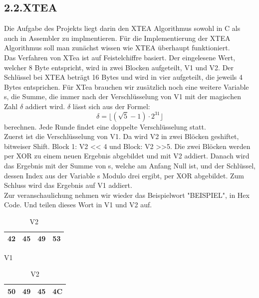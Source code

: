 \documentclass[course=asp]{aspdoc}
\begin{document}
\subsection*{2.2.XTEA}
Die Aufgabe des Projekts liegt darin den XTEA Algorithmus sowohl in C als auch in Assembler zu implmentieren. Für die Implementierung der XTEA Algorithmus soll man zunächst wissen wie XTEA überhaupt funktioniert. \\
Das Verfahren von XTea ist auf Feistelchiffre basiert. Der eingelesene Wert, welcher 8 Byte entspricht, wird in zwei Blocken aufgeteilt, V1 und V2. Der Schlüssel bei XTEA beträgt 16 Bytes und wird in vier aufgeteilt, die jeweils 4 Bytes entsprichen. Für XTea brauchen wir zusätzlich noch eine weitere Variable s, die Summe, die immer nach der Verschlüsselung von V1 mit der magischen Zahl ${\delta}$ addiert wird. ${\delta}$ lässt sich aus der Formel:
\begin{equation}
     \delta  =   \lfloor ( \surd 5 -1)  \cdot  2^{31} \rfloor
\end{equation}
berechnen. Jede Runde findet eine doppelte Verschlüsselung statt. \\
Zuerst ist die Verschlüsselung von V1. Da wird V2 in zwei Blöcken geshiftet, bitweiser Shift. Block 1: V2 << 4 und Block: V2 >>5. Die zwei Blöcken werden per XOR zu einem neuen Ergebnis abgebildet und mit V2 addiert. Danach wird das Ergebnis mit der Summe von s, welche am Anfang Null ist, und der Schlüssel, dessen Index aus der Variable s Modulo drei ergibt, per XOR abgebildet. Zum Schluss wird das Ergebnis auf V1 addiert. \\
Zur veranschaulichung nehmen wir wieder das Beispielwort "BEISPIEL", in Hex Code. Und teilen dieses Wort in V1 und V2 auf.
\begin{table}[H]

    \begin{minipage}{.5\linewidth}

      \centering
        \begin{tabular}{|l|l|l|l|}
		\hline
            42 & 45 & 49 & 53   \\
		\hline
        \end{tabular}

	\caption{V1}
    \end{minipage}%
    \begin{minipage}{.5\linewidth}

 \centering

        \begin{tabular}{|l|l|l|l|}
           \hline
		 50 & 49 & 45 & 4C   \\
		\hline
        \end{tabular}
\caption{V2}
    \end{minipage}
\end{table}
\end{document}
